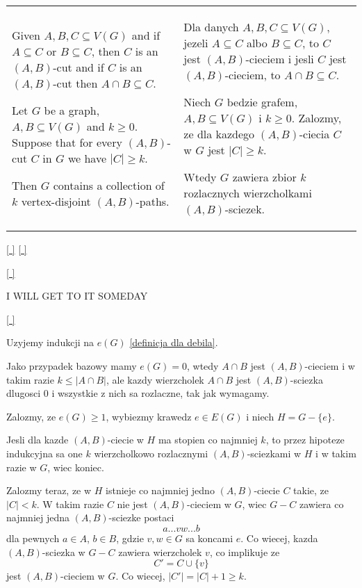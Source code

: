 \begin{tabularx}{\textwidth}{ X!{\color{git90gray}\vrule} X}

    Given $A,B,C\subseteq V(G)$ and if $A\subseteq C$ or $B\subseteq C$, then $C$ is an $(A,B)$-cut and if $C$ is an $(A,B)$-cut then $A\cap B\subseteq C$.
    \bigskip

    Let $G$ be a graph, $A,B\subseteq V(G)$ and $k\geq0$. Suppose that for every $(A,B)$-cut $C$ in $G$ we have $|C|\geq k$. 

    Then $G$ contains a collection of $k$ vertex-disjoint $(A,B)$-paths.

    &

    Dla danych $A,B,C\subseteq V(G)$, jezeli $A\subseteq C$ albo $B\subseteq C$, to $C$ jest $(A,B)$-cieciem i jesli $C$ jest $(A,B)$-cieciem, to $A\cap B\subseteq C$.
    \bigskip

    Niech $G$ bedzie grafem, $A,B\subseteq V(G)$ i $k\geq0$. Zalozmy, ze dla kazdego $(A,B)$-ciecia $C$ w $G$ jest $|C|\geq k$.

    Wtedy $G$ zawiera zbior $k$ rozlacznych wierzcholkami $(A,B)$-sciezek.

\end{tabularx}

\hyperref[vertex-disjoined-lemma-GB]{[ ]} \hyperref[vertex-disjoined-lemma-PL]{[ ]}
\label{vertex-disjoined-lemma-LAN}

\medskip

\hyperref[vertex-disjoined-lemma-LAN]{[ ]}
\label{vertex-disjoined-lemma-GB}
\medskip

{\color{cyan}I WILL GET TO IT SOMEDAY}

\hyperref[vertex-disjoined-lemma-LAN]{[ ]}
\label{vertex-disjoined-lemma-PL}
\medskip


Uzyjemy indukcji na $e(G)$ \hyperref[handshaking-lemma]{[definicja dla debila]}.
\smallskip

Jako przypadek bazowy mamy $e(G)=0$, wtedy $A\cap B$ jest $(A,B)$-cieciem i w takim razie $k\leq |A\cap B|$, ale kazdy wierzcholek $A\cap B$ jest $(A,B)$-sciezka dlugosci 0 i wszystkie z nich sa rozlaczne, tak jak wymagamy.
\medskip

Zalozmy, ze $e(G)\geq 1$, wybiezmy krawedz $e\in E(G)$ i niech $H=G-\{e\}$. 
\smallskip

Jesli dla kazde $(A,B)$-ciecie w $H$ ma stopien co najmniej $k$, to przez hipoteze indukcyjna sa one $k$ wierzcholkowo rozlacznymi $(A,B)$-sciezkami w $H$ i w takim razie w $G$, wiec koniec.
\smallskip

Zalozmy teraz, ze w $H$ istnieje co najmniej jedno $(A,B)$-ciecie $C$ takie, ze $|C|<k$. W takim razie $C$ nie jest $(A, B)$-cieciem w $G$, wiec $G-C$ zawiera co najmniej jedna $(A, B)$-sciezke postaci
$$a...vw...b$$
dla pewnych $a\in A$, $b\in B$, gdzie $v,w\in G$ sa koncami $e$. Co wiecej, kazda $(A, B)$-sciezka w $G-C$ zawiera wierzcholek $v$, co implikuje ze
$$C'=C\cup\{v\}$$
jest $(A, B)$-cieciem w $G$. Co wiecej, $|C'|=|C|+1\geq k$. 